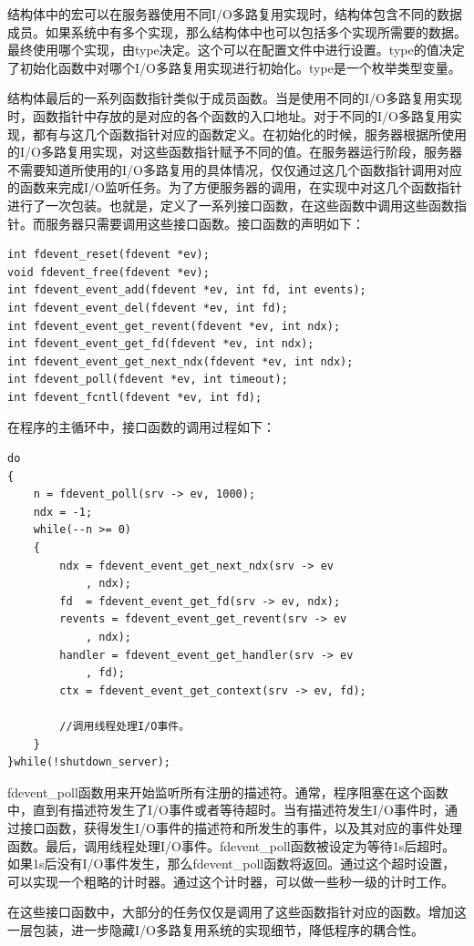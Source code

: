 \documentclass[twoside, xetex]{report}
\begin{document}
	结构体中的宏可以在服务器使用不同I/O多路复用实现时，结构体包含不同的数据成员。如果系统中有多个实现，那么结构体中也可以包括多个实现所需要的数据。最终使用哪个实现，由type决定。这个可以在配置文件中进行设置。type的值决定了初始化函数中对哪个I/O多路复用实现进行初始化。type是一个枚举类型变量。
	
	结构体最后的一系列函数指针类似于成员函数。当是使用不同的I/O多路复用实现时，函数指针中存放的是对应的各个函数的入口地址。对于不同的I/O多路复用实现，都有与这几个函数指针对应的函数定义。在初始化的时候，服务器根据所使用的I/O多路复用实现，对这些函数指针赋予不同的值。在服务器运行阶段，服务器不需要知道所使用的I/O多路复用的具体情况，仅仅通过这几个函数指针调用对应的函数来完成I/O监听任务。为了方便服务器的调用，在实现中对这几个函数指针进行了一次包装。也就是，定义了一系列接口函数，在这些函数中调用这些函数指针。而服务器只需要调用这些接口函数。接口函数的声明如下：
\begin{verbatim}
int fdevent_reset(fdevent *ev);
void fdevent_free(fdevent *ev);
int fdevent_event_add(fdevent *ev, int fd, int events);
int fdevent_event_del(fdevent *ev, int fd);
int fdevent_event_get_revent(fdevent *ev, int ndx);
int fdevent_event_get_fd(fdevent *ev, int ndx);
int fdevent_event_get_next_ndx(fdevent *ev, int ndx);
int fdevent_poll(fdevent *ev, int timeout);
int fdevent_fcntl(fdevent *ev, int fd);
\end{verbatim}

	在程序的主循环中，接口函数的调用过程如下：
\begin{verbatim}
do
{
	n = fdevent_poll(srv -> ev, 1000);
	ndx = -1;
	while(--n >= 0)
	{
		ndx = fdevent_event_get_next_ndx(srv -> ev
			, ndx);
		fd  = fdevent_event_get_fd(srv -> ev, ndx);
		revents = fdevent_event_get_revent(srv -> ev
			, ndx);
		handler = fdevent_event_get_handler(srv -> ev
			, fd);
		ctx = fdevent_event_get_context(srv -> ev, fd);			
		
		//调用线程处理I/O事件。
	}
}while(!shutdown_server);
\end{verbatim}	

	fdevent\_poll函数用来开始监听所有注册的描述符。通常，程序阻塞在这个函数中，直到有描述符发生了I/O事件或者等待超时。当有描述符发生I/O事件时，通过接口函数，获得发生I/O事件的描述符和所发生的事件，以及其对应的事件处理函数。最后，调用线程处理I/O事件。fdevent\_poll函数被设定为等待1s后超时。如果1s后没有I/O事件发生，那么fdevent\_poll函数将返回。通过这个超时设置，可以实现一个粗略的计时器。通过这个计时器，可以做一些秒一级的计时工作。
	
	在这些接口函数中，大部分的任务仅仅是调用了这些函数指针对应的函数。增加这一层包装，进一步隐藏I/O多路复用系统的实现细节，降低程序的耦合性。
\end{document}
